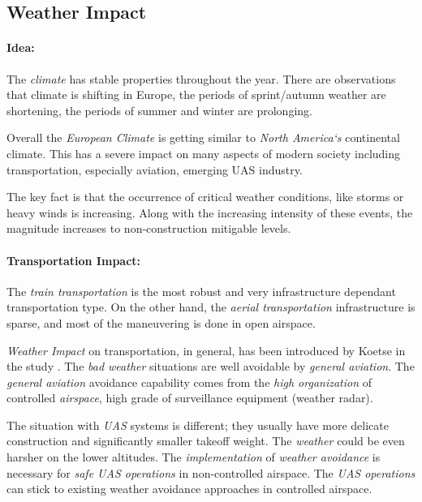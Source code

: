 \subsection{Weather Impact}\label{sec:WeatherImpact}

\paragraph{Idea:} The \emph{climate} has stable properties throughout the year. There are observations that climate is shifting in Europe, the periods of sprint/autumn weather are shortening, the periods of summer and winter are prolonging. 

Overall the \emph{European Climate} is getting similar to \emph{North America`s} continental climate. This has a severe impact on many aspects of modern society including transportation, especially aviation, emerging UAS industry. 

The key fact is that the occurrence of critical weather conditions, like storms or heavy winds is increasing. Along with the increasing intensity of these events, the magnitude increases to non-construction mitigable levels.

\paragraph{Transportation Impact:} The \emph{train transportation} is the most robust and very infrastructure dependant transportation type. On the other hand, the \emph{aerial transportation} infrastructure is sparse, and most of the maneuvering is done in open airspace. 

\emph{Weather Impact} on transportation, in general, has been introduced by Koetse in the study \cite{koetse2009impact}. The \emph{bad weather} situations are well avoidable by \emph{general aviation}. The \emph{general aviation} avoidance capability comes from the \emph{high organization} of controlled \emph{airspace}, high grade of surveillance equipment (weather radar).

The situation with \emph{UAS} systems is different; they usually have more delicate construction and significantly smaller takeoff weight. The \emph{weather} could be even harsher on the lower altitudes. The \emph{implementation} of \emph{weather avoidance} is necessary for \emph{safe UAS operations} in non-controlled airspace. The \emph{UAS operations} can stick to existing weather avoidance approaches in controlled airspace. 

